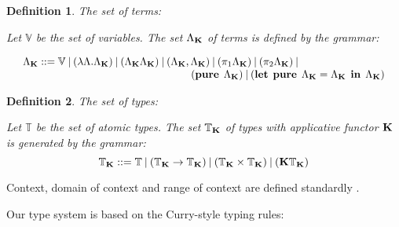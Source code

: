 \documentclass[a4paper]{article}
\newtheorem{defin}{Definition}
\begin{document}
  \begin{defin} The set of terms:

  Let $\mathbb{V}$ be the set of variables. The set $\Lambda_{{\bf K}}$ of terms is defined by the grammar:

$\begin{array}{lll}
& \Lambda_{{\bf K}} ::= \mathbb{V} \: | \:  (\lambda \Lambda.\Lambda_{{\bf K}}) \: | \: (\Lambda_{{\bf K}}\Lambda_{{\bf K}}) \: | \: (\Lambda_{{\bf K}} , \Lambda_{{\bf K}}) \: | \: (\pi_1 \Lambda_{{\bf K}}) \: | \: (\pi_2 \Lambda_{{\bf K}}) \: | & \\
& \quad\quad\quad\quad\quad\quad\quad\quad\quad\quad\quad\quad\quad\quad\quad\quad ({\bf pure \: } \: \Lambda_{{\bf K}}) \: | \: ({\bf let \:\: pure} \:\: \Lambda_{{\bf K}} = \Lambda_{{\bf K}} \:\: {\bf in} \:\: \Lambda_{{\bf K}})
\end{array}$

  \end{defin}

  \begin{defin} The set of types:

  Let $\mathbb{T}$ be the set of atomic types. The set $\mathbb{T}_{{\bf K}}$ of types with applicative
  functor ${\bf K}$ is generated by the grammar:
  \begin{equation}
    \mathbb{T}_{{\bf K}} ::= \mathbb{T} \: | \: (\mathbb{T}_{{\bf K}} \to \mathbb{T}_{{\bf K}}) \: |
    \: (\mathbb{T}_{{\bf K}} \times \mathbb{T}_{{\bf K}}) \: | \: ({\bf K}\mathbb{T}_{{\bf K}})
  \end{equation}
  \end{defin}

  Context, domain of context and range of context are defined standardly \cite{Neder}\cite{Morten}.

  Our type system is based on the Curry-style typing rules:
\end{document}
